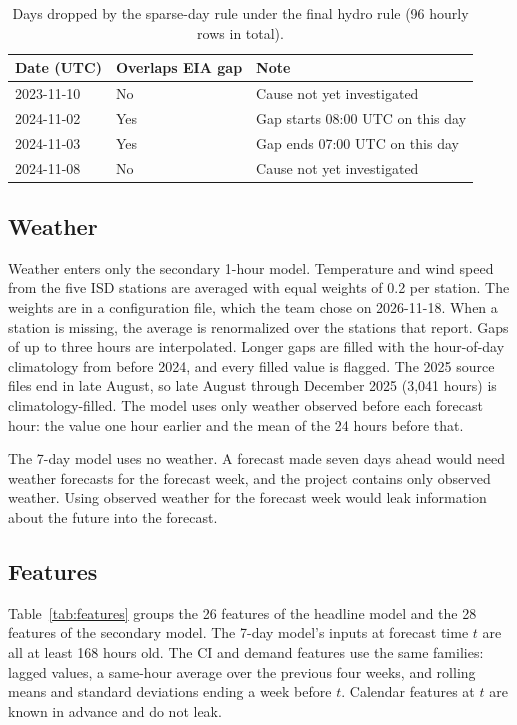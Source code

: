 \documentclass[10pt,journal,compsoc]{IEEEtran}
\begin{document}
\begin{table}[t]
\caption{Days dropped by the sparse-day rule under the final hydro rule (96 hourly rows in total).}
\label{tab:dropped}
\centering
\small
\begin{tabular}{@{}p{3.5cm}p{4.5cm}p{7.0cm}@{}}
\toprule
Date (UTC) & Overlaps EIA gap & Note \\
\midrule
2023-11-10 & No & Cause not yet investigated \\
2024-11-02 & Yes & Gap starts 08:00 UTC on this day \\
2024-11-03 & Yes & Gap ends 07:00 UTC on this day \\
2024-11-08 & No & Cause not yet investigated \\
\bottomrule
\end{tabular}
\end{table}

\subsection{Weather}
Weather enters only the secondary 1-hour model. Temperature and wind speed from the five ISD stations are averaged with equal weights of 0.2 per station. The weights are in a configuration file, which the team chose on 2026-11-18. When a station is missing, the average is renormalized over the stations that report. Gaps of up to three hours are interpolated. Longer gaps are filled with the hour-of-day climatology from before 2024, and every filled value is flagged. The 2025 source files end in late August, so late August through December 2025 (3,041 hours) is climatology-filled. The model uses only weather observed before each forecast hour: the value one hour earlier and the mean of the 24 hours before that.

The 7-day model uses no weather. A forecast made seven days ahead would need weather forecasts for the forecast week, and the project contains only observed weather. Using observed weather for the forecast week would leak information about the future into the forecast.

\subsection{Features}
Table~\ref{tab:features} groups the 26 features of the headline model and the 28 features of the secondary model. The 7-day model's inputs at forecast time $t$ are all at least 168 hours old. The CI and demand features use the same families: lagged values, a same-hour average over the previous four weeks, and rolling means and standard deviations ending a week before $t$. Calendar features at $t$ are known in advance and do not leak.
\end{document}

